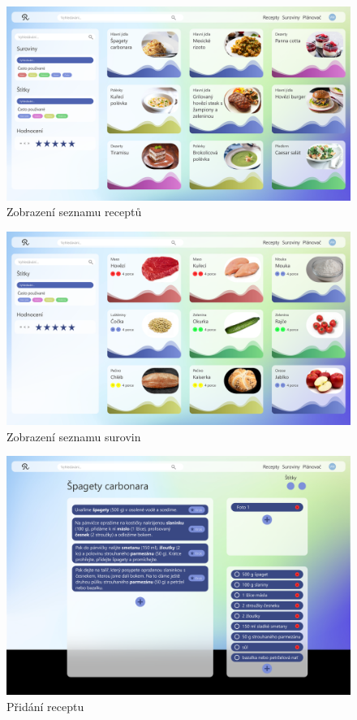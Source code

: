 \begin{figure}[h]
    \includegraphics[width=\textwidth]{pdf/adobexd/recepty}
    \caption{Zobrazení seznamu receptů} \label{picture:recipeo:recepty}
\end{figure}

\begin{figure}[h]
    \includegraphics[width=\textwidth]{pdf/adobexd/suroviny}
    \caption{Zobrazení seznamu surovin} \label{picture:recipeo:suroviny}
\end{figure}

\begin{figure}[h]
    \includegraphics[width=\textwidth]{pdf/adobexd/vlozeni-receptu}
    \caption{Přidání receptu} \label{picture:recipeo:vlozeni-receptu}
\end{figure}

